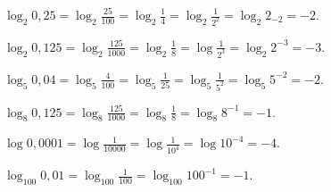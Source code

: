\begin{alist}
\item $ \log_2{0{,}25}=\log_2{\frac{25}{100}}=\log_2{\frac{1}{4}}=\log_2{\frac{1}{2^{2}}}=\log_2{2_{-2}}=-2 $.
\item $ \log_2{0{,}125}=\log_2{\frac{125}{1000}}=\log_2{\frac{1}{8}}=\log{\frac{1}{2^3}}=\log_2{2^{-3}}=-3 $.
\item $ \log_5{0{,}04}=\log_5{\frac{4}{100}}=\log_5{\frac{1}{25}}=\log_5{\frac{1}{5^2}}=\log_5{5^{-2}}=-2 $.
\item $ \log_8{0{,}125}=\log_8{\frac{125}{1000}}=\log_8{\frac{1}{8}}=\log_8{8^{-1}}=-1 $.
\item $ \log{0{,}0001}=\log{\frac{1}{10000}}=\log{\frac{1}{10^4}}=\log{10^{-4}}=-4 $.
\item $ \log_{100}{0{,}01}=\log_{100}{\frac{1}{100}}=\log_{100}{100^{-1}}=-1 $.
\end{alist}
